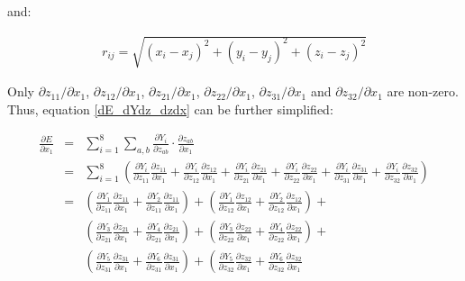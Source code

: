 \noindent and:

\begin{eqnarray}
r_{ij} = \sqrt{(x_i - x_j)^2 + (y_i - y_j)^2 + (z_i - z_j)^2}
\end{eqnarray}

\noindent Only $\partial{z_{11}} / \partial{x_1}$, 
$\partial{z_{12}} / \partial{x_1}$, $\partial{z_{21}} / \partial{x_1}$,
$\partial{z_{22}} / \partial{x_1}$, $\partial{z_{31}} / \partial{x_1}$ and
$\partial{z_{32}} / \partial{x_1}$ are non-zero. Thus, equation \ref{dE_dYdz_dzdx} 
can be further simplified:

\begin{eqnarray}
\frac{\partial{E}}{\partial{x_1}} 
& = & 
\sum_{i=1}^{8}{
	\sum_{a,b}{
		\frac{\partial{Y_{i}}}{\partial{z_{ab}}} 
		\cdot 
		\frac{\partial{z_{ab}}}{\partial{x_{1}}}
	}
} \nonumber \\
& = & 
\sum_{i=1}^{8}{\left(
	\frac{\partial{Y_{i}}}{\partial{z_{11}}}\frac{\partial{z_{11}}}{\partial{x_1}} +
	\frac{\partial{Y_{i}}}{\partial{z_{12}}}\frac{\partial{z_{12}}}{\partial{x_1}} +
	\frac{\partial{Y_{i}}}{\partial{z_{21}}}\frac{\partial{z_{21}}}{\partial{x_1}} +
	\frac{\partial{Y_{i}}}{\partial{z_{22}}}\frac{\partial{z_{22}}}{\partial{x_1}} +
	\frac{\partial{Y_{i}}}{\partial{z_{31}}}\frac{\partial{z_{31}}}{\partial{x_1}} +
	\frac{\partial{Y_{i}}}{\partial{z_{32}}}\frac{\partial{z_{32}}}{\partial{x_1}}
\right)
} \nonumber \\
& = &
\left(
	\frac{\partial{Y_{1}}}{\partial{z_{11}}}\frac{\partial{z_{11}}}{\partial{x_1}} +
	\frac{\partial{Y_{2}}}{\partial{z_{11}}}\frac{\partial{z_{11}}}{\partial{x_1}} 
\right) +
\left(
	\frac{\partial{Y_{1}}}{\partial{z_{12}}}\frac{\partial{z_{12}}}{\partial{x_1}} +
	\frac{\partial{Y_{2}}}{\partial{z_{12}}}\frac{\partial{z_{12}}}{\partial{x_1}} 
\right) + \nonumber \\
&&
\left(
	\frac{\partial{Y_{3}}}{\partial{z_{21}}}\frac{\partial{z_{21}}}{\partial{x_1}} +
	\frac{\partial{Y_{4}}}{\partial{z_{21}}}\frac{\partial{z_{21}}}{\partial{x_1}} 
\right) +
\left(
	\frac{\partial{Y_{3}}}{\partial{z_{22}}}\frac{\partial{z_{22}}}{\partial{x_1}} +
	\frac{\partial{Y_{4}}}{\partial{z_{22}}}\frac{\partial{z_{22}}}{\partial{x_1}} 
\right) + \nonumber \\
&&
\left(
	\frac{\partial{Y_{5}}}{\partial{z_{31}}}\frac{\partial{z_{31}}}{\partial{x_1}} +
	\frac{\partial{Y_{6}}}{\partial{z_{31}}}\frac{\partial{z_{31}}}{\partial{x_1}} 
\right) +
\left(
	\frac{\partial{Y_{5}}}{\partial{z_{32}}}\frac{\partial{z_{32}}}{\partial{x_1}} +
	\frac{\partial{Y_{6}}}{\partial{z_{32}}}\frac{\partial{z_{32}}}{\partial{x_1}}

\end{eqnarray}

